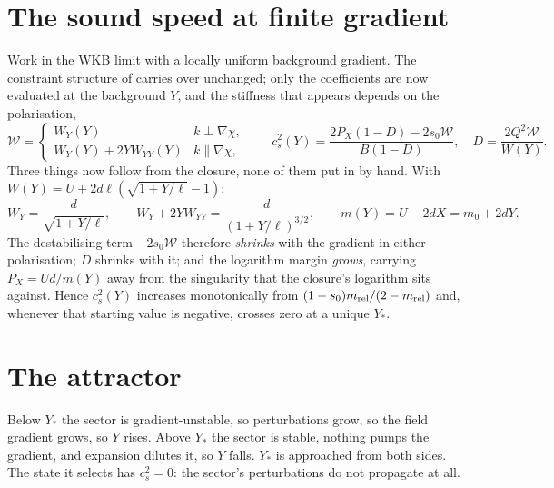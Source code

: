 \documentclass[11pt,letterpaper]{article}
\begin{document}
\section{The sound speed at finite gradient}
Work in the WKB limit with a locally uniform background gradient. The constraint structure of \cite{paper17} carries over unchanged; only the coefficients are now evaluated at the background $Y$, and the stiffness that appears depends on the polarisation,
\begin{equation}
\mathcal{W}=\begin{cases} W_Y(Y) & k\perp\nabla\chi,\\ W_Y(Y)+2YW_{YY}(Y) & k\parallel\nabla\chi,\end{cases}
\qquad
c_s^2(Y)=\frac{2P_X(1-D)-2s_0\mathcal{W}}{B(1-D)},\quad D=\frac{2Q^2\mathcal{W}}{W(Y)} .
\label{csY}
\end{equation}
Three things now follow from the closure, none of them put in by hand. With $W(Y)=U+2d\ell(\sqrt{1+Y/\ell}-1)$:
\begin{equation}
W_Y=\frac{d}{\sqrt{1+Y/\ell}},\qquad W_Y+2YW_{YY}=\frac{d}{(1+Y/\ell)^{3/2}},\qquad m(Y)=U-2dX=m_0+2dY .
\end{equation}
The destabilising term $-2s_0\mathcal{W}$ therefore \emph{shrinks} with the gradient in either polarisation; $D$ shrinks with it; and the logarithm margin \emph{grows}, carrying $P_X=Ud/m(Y)$ away from the singularity that the closure's logarithm sits against. Hence $c_s^2(Y)$ increases monotonically from $(1-s_0)m_{\rm rel}/(2-m_{\rm rel})$ and, whenever that starting value is negative, crosses zero at a unique $Y_*$.

\section{The attractor}
Below $Y_*$ the sector is gradient-unstable, so perturbations grow, so the field gradient grows, so $Y$ rises. Above $Y_*$ the sector is stable, nothing pumps the gradient, and expansion dilutes it, so $Y$ falls. $Y_*$ is approached from both sides. The state it selects has $c_s^2=0$: the sector's perturbations do not propagate at all.
\end{document}
